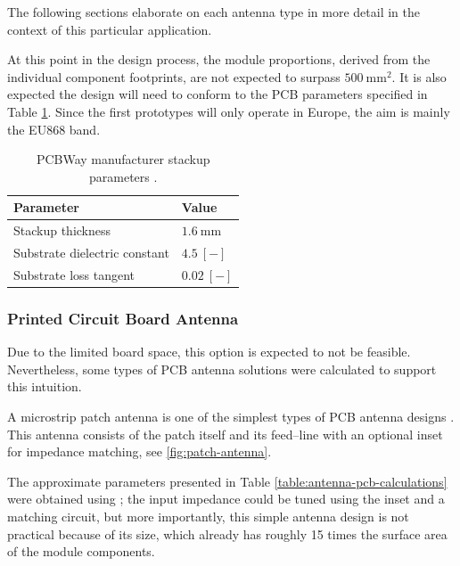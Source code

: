 The following sections elaborate on each antenna type in more detail in the context of this particular application. 

At this point in the design process, the module proportions, derived from the individual component footprints, are not expected to surpass $500~\mathrm{mm^2}$. It is also expected the design will need to conform to the PCB parameters specified in Table \ref{table:pcb-parameters}. Since the first prototypes will only operate in Europe, the aim is mainly the EU868 band.

\begin{table}[H]
\begin{center}
\caption{\label{table:pcb-parameters}PCBWay manufacturer stackup parameters \cite{pcbway_stackup_2024}.}
    \begin{tabular}{|l|l|} \hline
    \textbf{Parameter}            & \textbf{Value} \\ \hline
    Stackup thickness             & $1.6~\mathrm{mm}$ \\ \hline
    Substrate dielectric constant & $4.5~\mathrm{[-]}$ \\ \hline
    Substrate loss tangent        & $0.02~\mathrm{[-]}$ \\ \hline
    \end{tabular}
\end{center}
\end{table}

\subsubsection{Printed Circuit Board Antenna}
Due to the limited board space, this option is expected to not be feasible. Nevertheless, some types of PCB antenna solutions were calculated to support this intuition.

A microstrip patch antenna is one of the simplest types of PCB antenna designs \cite{zachariah_peterson_microstrip_2022,wallace_an058_nodate}. This antenna consists of the patch itself and its feed--line with an optional inset for impedance matching, see \ref{fig:patch-antenna}. 

The approximate parameters presented in Table \ref{table:antenna-pcb-calculations} were obtained using \cite{zachariah_peterson_microstrip_2022}; the input impedance could be tuned using the inset and a matching circuit, but more importantly, this simple antenna design is not practical because of its size, which already has roughly 15 times the surface area of the module components.


